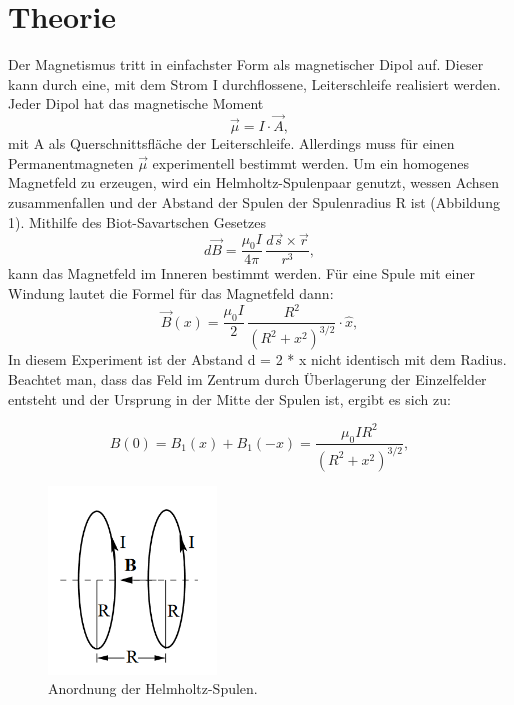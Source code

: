 \section{Theorie}
\label{sec:Theorie}

\cite{sample}
Der Magnetismus tritt in einfachster Form als magnetischer Dipol auf. Dieser kann durch eine, mit dem Strom I durchflossene, Leiterschleife realisiert werden. Jeder Dipol hat das magnetische Moment
\begin{equation}
    \vec{\mu} = I \cdot \vec{A} ,
\end{equation}
mit A als Querschnittsfläche der Leiterschleife. Allerdings muss für einen Permanentmagneten $\vec{\mu}$ experimentell bestimmt werden.
Um ein homogenes Magnetfeld zu erzeugen, wird ein Helmholtz-Spulenpaar genutzt, wessen Achsen zusammenfallen und der Abstand der Spulen der Spulenradius R ist (Abbildung 1).
Mithilfe des Biot-Savartschen Gesetzes
\begin{equation}
    d\vec{B} =  \frac{\mu_\text{0}I}{4\pi}\,\frac{d\vec{s}\times\vec{r}}{r^3} ,
\end{equation}
kann das Magnetfeld im Inneren bestimmt werden.
Für eine Spule mit einer Windung lautet die Formel für das Magnetfeld dann:
\begin{equation}
    \vec{B}(x) = \frac{\mu_\text{0}I}{2}\,\frac{R^2}{(R^2+x^2)^{3/2}}\cdot \hat{x} ,
\end{equation}
In diesem Experiment ist der Abstand d = 2 * x nicht identisch mit dem Radius.
Beachtet man, dass das Feld im Zentrum durch Überlagerung der Einzelfelder entsteht und der Ursprung in der Mitte der Spulen ist,
ergibt es sich zu:

\begin{equation}
   B(0) = B_\text{1}(x)+B_\text{1}(-x) = \frac{\mu_\text{0}IR^2}{(R^2+x^2)^{3/2}} ,
\end{equation}

\begin{figure}[H]
  \centering
  \includegraphics[height=5cm]{Screenshot (2)}
  \caption{Anordnung der Helmholtz-Spulen.}
  \label{fig:drill}
\end{figure}


